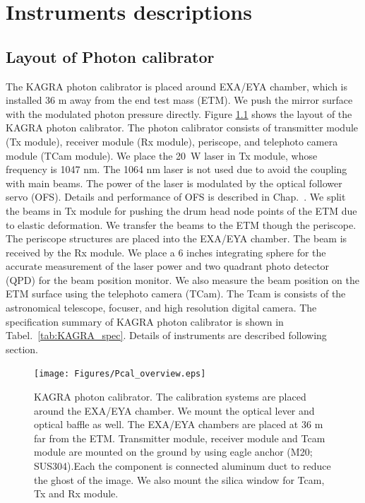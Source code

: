 
\chapter{Instruments descriptions} %

\label{Chapter3} %




\section{Layout of Photon calibrator}
The KAGRA photon calibrator is placed around EXA/EYA chamber, which is installed 36 m away from the end test mass (ETM). We push the mirror surface with the modulated photon pressure directly. Figure \ref{fig:Pcal_overview} shows the layout of the KAGRA photon calibrator. The photon calibrator consists of transmitter module (Tx module), receiver module (Rx module), periscope, and telephoto camera module (TCam module). We place the 20~W laser in Tx module, whose frequency is 1047 nm. The 1064 nm laser is not used due to avoid the coupling with main beams.   The power of the laser is modulated by the optical follower servo (OFS). Details and performance of OFS is described in Chap.~\cite{OFS}. We split the beams in Tx module for pushing the drum head node points of the ETM due to elastic deformation. We transfer the beams to the ETM though the periscope. The periscope structures are placed into the EXA/EYA chamber. The beam is received by the Rx module. We place a 6 inches integrating sphere for the accurate measurement of the laser power and two quadrant photo detector (QPD) for the beam position monitor. We also measure the beam position on the ETM surface using the telephoto camera (TCam). The Tcam is consists of the astronomical telescope, focuser, and high resolution digital camera. The specification summary of KAGRA photon calibrator is shown in Tabel.~\ref{tab:KAGRA_spec}. Details of instruments are described following section.
\begin{figure}
\begin{center}
\texttt{[image: Figures/Pcal\_overview.eps]}
\caption{KAGRA photon calibrator. The calibration systems are placed around the EXA/EYA chamber. We mount the optical lever and optical baffle as well. The EXA/EYA chambers are placed at 36 m far from the ETM. Transmitter module, receiver module and Tcam module are mounted on the ground by using eagle anchor (M20; SUS304).Each the component is connected aluminum duct to reduce the ghost of the image. We also mount the silica window for Tcam, Tx and Rx module.} 
\label{fig:Pcal_overview} 
\end{center}
\end{figure}

